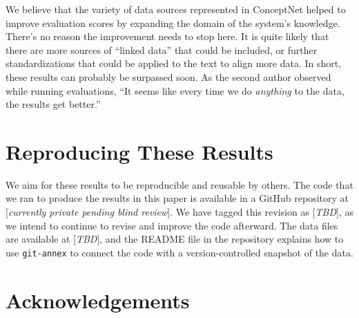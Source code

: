 \documentclass[11pt,letterpaper]{article}
\begin{document}
We believe that the variety of data sources represented in ConceptNet helped to
improve evaluation scores by expanding the domain of the system's knowledge.
There's no reason the improvement needs to stop here. It is quite likely that
there are more sources of ``linked data'' that could be included, or further
standardizations that could be applied to the text to align more data. In
short, these results can probably be surpassed soon. As the second author
observed while running evaluations, ``It seems like every time we do {\em
anything} to the data, the results get better.''

\section{Reproducing These Results}

We aim for these results to be reproducible and reusable by others. The code
that we ran to produce the results in this paper is available in a GitHub
repository at [{\em currently private pending blind review}]. We have tagged
this revision as [{\em TBD}], as we intend to continue to revise and improve the
code afterward. The data files are available at [{\em TBD}], and the README file
in the repository explains how to use {\tt git-annex} to connect the code
with a version-controlled snapshot of the data.

\section*{Acknowledgements}

\begin{CJK*}{UTF8}{min}

\end{CJK*}
\end{document}
